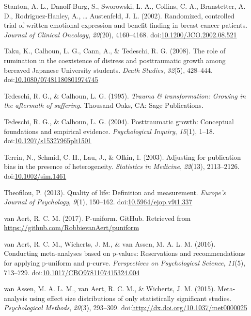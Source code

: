 \documentclass[man, mask]{apa6}
\theoremstyle{definition}
\theoremstyle{definition}
\theoremstyle{definition}
\theoremstyle{remark}
\begin{document}
\hypertarget{ref-Stanton2002}{}
Stanton, A. L., Danoff-Burg, S., Sworowski, L. A., Collins, C. A.,
Branstetter, A. D., Rodriguez-Hanley, A., \ldots{} Austenfeld, J. L.
(2002). Randomized, controlled trial of written emotional expression and
benefit finding in breast cancer patients. \emph{Journal of Clinical
Oncology}, \emph{20}(20), 4160--4168.
doi:\href{https://doi.org/10.1200/JCO.2002.08.521}{10.1200/JCO.2002.08.521}

\hypertarget{ref-Taku2008}{}
Taku, K., Calhoun, L. G., Cann, A., \& Tedeschi, R. G. (2008). The role
of rumination in the coexistence of distress and posttraumatic growth
among bereaved Japanese University students. \emph{Death Studies},
\emph{32}(5), 428--444.
doi:\href{https://doi.org/10.1080/07481180801974745}{10.1080/07481180801974745}

\hypertarget{ref-Tedeschi1995}{}
Tedeschi, R. G., \& Calhoun, L. G. (1995). \emph{Trauma \&
transformation: Growing in the aftermath of suffering.} Thousand Oaks,
CA: Sage Publications.

\hypertarget{ref-Tedeschi2004}{}
Tedeschi, R. G., \& Calhoun, L. G. (2004). Posttraumatic growth:
Conceptual foundations and empirical evidence. \emph{Psychological
Inquiry}, \emph{15}(1), 1--18.
doi:\href{https://doi.org/10.1207/s15327965pli1501}{10.1207/s15327965pli1501}

\hypertarget{ref-Terrin2003}{}
Terrin, N., Schmid, C. H., Lau, J., \& Olkin, I. (2003). Adjusting for
publication bias in the presence of heterogeneity. \emph{Statistics in
Medicine}, \emph{22}(13), 2113--2126.
doi:\href{https://doi.org/10.1002/sim.1461}{10.1002/sim.1461}

\hypertarget{ref-Theofilou2013}{}
Theofilou, P. (2013). Quality of life: Definition and measurement.
\emph{Europe's Journal of Psychology}, \emph{9}(1), 150--162.
doi:\href{https://doi.org/10.5964/ejop.v9i1.337}{10.5964/ejop.v9i1.337}

\hypertarget{ref-VanAert2017}{}
van Aert, R. C. M. (2017). P-uniform. GitHub. Retrieved from
\url{https://github.com/RobbievanAert/puniform}

\hypertarget{ref-VanAert2016}{}
van Aert, R. C. M., Wicherts, J. M., \& van Assen, M. A. L. M. (2016).
Conducting meta-analyses based on p-values: Reservations and
recommendations for applying p-uniform and p-curve. \emph{Perspectives
on Psychological Science}, \emph{11}(5), 713--729.
doi:\href{https://doi.org/10.1017/CBO9781107415324.004}{10.1017/CBO9781107415324.004}

\hypertarget{ref-VanAssen2015}{}
van Assen, M. A. L. M., van Aert, R. C. M., \& Wicherts, J. M. (2015).
Meta-analysis using effect size distributions of only statistically
significant studies. \emph{Psychological Methods}, \emph{20}(3),
293--309.
doi:\href{https://doi.org/http://dx.doi.org/10.1037/met0000025}{http://dx.doi.org/10.1037/met0000025}
\end{document}
